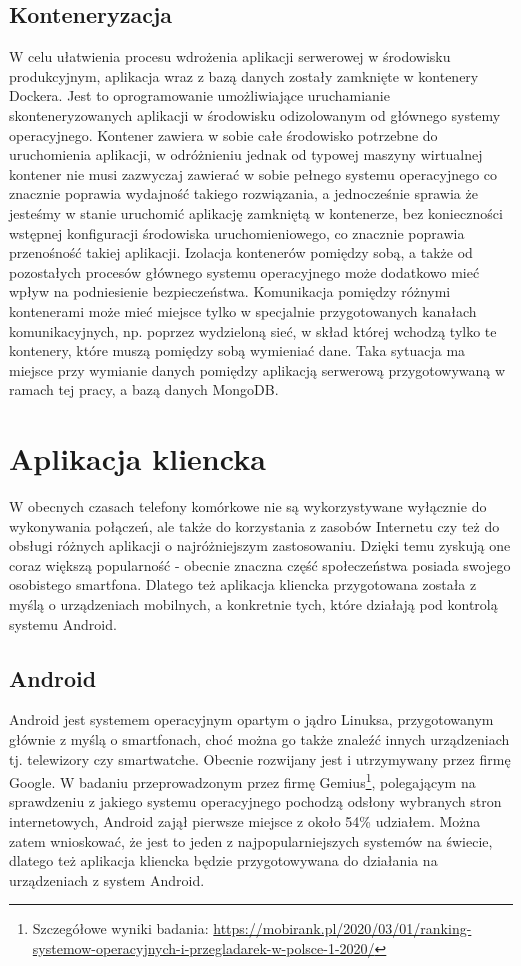 \documentclass[a4paper,12pt,twoside,openany]{report}
\begin{document}
\subsection{Konteneryzacja}
W celu ułatwienia procesu wdrożenia aplikacji serwerowej w środowisku produkcyjnym, aplikacja wraz z bazą danych zostały zamknięte w kontenery Dockera. Jest to oprogramowanie  umożliwiające uruchamianie skonteneryzowanych aplikacji w środowisku odizolowanym od głównego systemy operacyjnego. Kontener zawiera w sobie całe środowisko potrzebne do uruchomienia aplikacji, w odróżnieniu jednak od typowej maszyny wirtualnej kontener nie musi zazwyczaj zawierać w sobie pełnego systemu operacyjnego co znacznie poprawia wydajność takiego rozwiązania, a jednocześnie sprawia że jesteśmy w stanie uruchomić aplikację zamkniętą w kontenerze, bez konieczności wstępnej konfiguracji środowiska uruchomieniowego, co znacznie poprawia przenośność takiej aplikacji. Izolacja kontenerów pomiędzy sobą, a także od pozostałych procesów głównego systemu operacyjnego może dodatkowo mieć wpływ na podniesienie bezpieczeństwa. Komunikacja pomiędzy różnymi kontenerami może mieć miejsce tylko w specjalnie przygotowanych kanałach komunikacyjnych, np. poprzez wydzieloną sieć, w skład której wchodzą tylko te kontenery, które muszą pomiędzy sobą wymieniać dane. Taka sytuacja ma miejsce przy wymianie danych pomiędzy aplikacją serwerową przygotowywaną w ramach tej pracy, a bazą danych MongoDB.


\section{Aplikacja kliencka}
W obecnych czasach telefony komórkowe nie są wykorzystywane wyłącznie do wykonywania połączeń, ale także do korzystania z zasobów Internetu czy też do obsługi różnych aplikacji o najróżniejszym zastosowaniu. Dzięki temu zyskują one coraz większą popularność - obecnie znaczna część społeczeństwa posiada swojego osobistego smartfona. Dlatego też aplikacja kliencka przygotowana została z myślą o urządzeniach mobilnych, a konkretnie tych, które działają pod kontrolą systemu Android. 

\subsection{Android}
Android jest systemem operacyjnym opartym o jądro Linuksa, przygotowanym głównie z myślą o smartfonach, choć można go także znaleźć innych urządzeniach tj. telewizory czy smartwatche. Obecnie rozwijany jest i utrzymywany przez firmę Google. W badaniu przeprowadzonym przez firmę Gemius\footnote{ Szczegółowe wyniki badania: \url{https://mobirank.pl/2020/03/01/ranking-systemow-operacyjnych-i-przegladarek-w-polsce-1-2020/}}, polegającym na sprawdzeniu z jakiego systemu operacyjnego pochodzą odsłony wybranych stron internetowych, Android zajął pierwsze miejsce z około 54\% udziałem. Można zatem wnioskować, że jest to jeden z najpopularniejszych systemów na świecie, dlatego też aplikacja kliencka będzie przygotowywana do działania na urządzeniach z system Android. 
 
\end{document}
